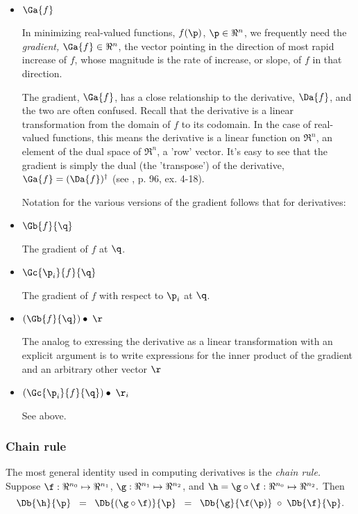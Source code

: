 \begin{itemize}

\item $\Ga{f}$

In minimizing real-valued functions, $f(\p)$, $\p \in \Re^n$,
we frequently need
the {\it gradient,} $\Ga{f} \in \Re^n$,
the vector pointing in the direction of most rapid increase of $f$,
whose magnitude is the rate of increase, or slope,
of $f$ in that direction.

The gradient, $\Ga{f}$,
has a close relationship to the derivative, $\Da{f}$,
and the two are often confused.
Recall that the derivative is a linear transformation
from the domain of $f$ to its codomain.
In the case of real-valued functions,
this means the derivative is a linear function on $\Re^n$,
an element of the dual space of $\Re^n$, a 'row' vector.
It's easy to see that the gradient is simply the dual (the 'transpose')
of the derivative, $\Ga{f} = (\Da{f})^{\dagger}$
(see \cite{spivak-1965}, p. 96, ex. 4-18).

Notation for the various versions of the gradient
follows that for derivatives:

\item $\Gb{f}{\q}$

The gradient of $f$ at $\q$.

\item $\Gc{\p_i}{f}{\q}$

The gradient of $f$
with respect to $\p_i$ at $\q$.

\item $(\Gb{f}{\q}) \bullet \; \r$

The analog to exressing the derivative as a linear transformation
with an explicit argument is to write expressions for
the inner product of the gradient and an arbitrary other vector $\r$

\item $(\Gc{\p_i}{f}{\q}) \bullet \;\r_i$

See above.

\end{itemize}



\subsubsection{Chain rule}
\label{sec:chain}

The most general identity used in computing derivatives is the {\it chain rule.}
Suppose
$\f:\Re^{n_0} \mapsto \Re^{n_1}$,
$\g:\Re^{n_1} \mapsto \Re^{n_2}$,
and
$\h = \g \circ \f : \Re^{n_0} \mapsto \Re^{n_2}.$
Then
\begin{equation}
\label{eq:chain_rule}
\Db{\h}{\p} \;\; = \;\; \Db{(\g \circ \f)}{\p}
            \;\; = \;\; \Db{\g}{\f(\p)} \; \circ \; \Db{\f} {\p}.
\end{equation}

